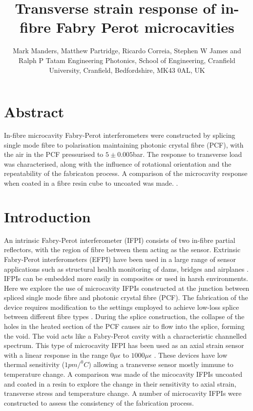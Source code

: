 \documentclass[]{spie}  %
\title{Transverse strain response of in-fibre Fabry Perot microcavities}
\author{Mark Manders, Matthew Partridge, Ricardo Correia, Stephen W James\supit{*} and Ralph P Tatam
\skiplinehalf
Engineering Photonics, School of Engineering, Cranfield University, Cranfield, Bedfordshire, MK43 0AL, UK %
}
\begin{document}
 
\maketitle 

\section*{Abstract}
In-fibre microcavity Fabry-Perot interferometers were constructed by splicing single mode fibre to polarisation maintaining photonic crystal fibre (PCF), with the air in the PCF pressurised to $5\pm0.005$bar. The response to transverse load was characterised, along with the influence of rotational orientation and the repeatability of the fabricaton process. A comparison of the microcavity response when coated in a fibre resin cube to uncoated was made. .


\section{Introduction}
An intrinsic Fabry-Perot interferometer (IFPI) consists of two in-fibre partial reflectors, with the region of fibre between them acting as the sensor\cite{2006MicroFP}. Extrinsic Fabry-Perot interferometers (EFPI) have been used in a large range of sensor applications such as structural health monitoring of dams, bridges and airplanes \cite{2006ProgFPI}. IFPIs can be embedded more easily in composites or used in harsh environments\cite{2006MicroFP}. Here we explore the use of microcavity IFPIs constructed at the junction between spliced single mode fibre and photonic crystal fibre (PCF)\cite{FibreBubble2011}. The fabrication of the device requires modification to the settings employed to achieve low-loss splice between different fibre types \cite{LowLossPCFsplice2012}. During the splice construction, the collapse of the holes in the heated section of the PCF causes air to flow into the splice, forming the void\cite{FibreBubble2011}. The void acts like a Fabry-Perot cavity with a characteristic channelled spectrum. This type of microcavity IFPI has been used as an axial strain sensor with a linear response in the range $0 \mu \epsilon$ to $1000 \mu \epsilon$ \cite{SpheFibreBub2012}. These devices have low thermal sensitivity ($1pm/ ^{0}C$) allowing a transverse sensor mostly immune to temperature change\cite{SpheFibreBub2012}. A comparison was made of the micocavity IFPIs uncoated and coated in a resin to explore the change in their sensitivity to axial strain, transverse stress and temperature change. A number of microcavity IFPIs were constructed to assess the consistency of the fabrication process.
\end{document}
